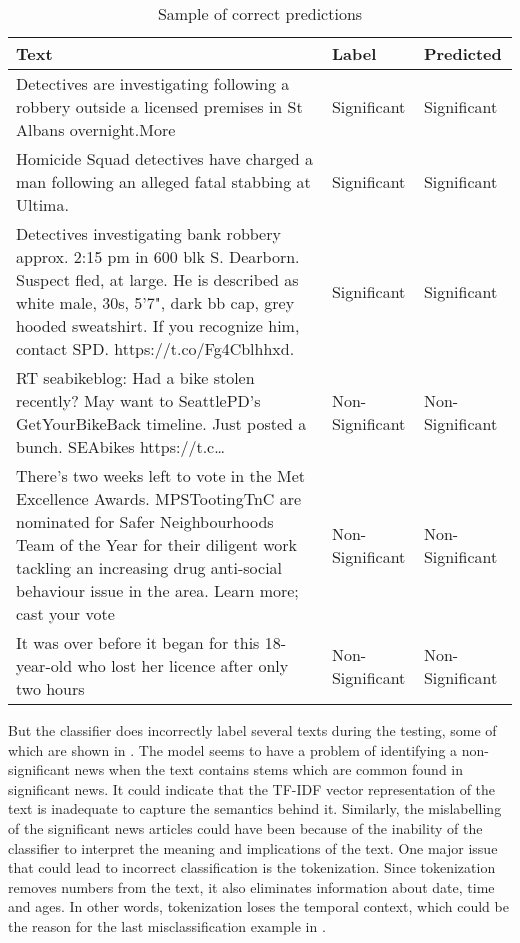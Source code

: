 \begin{table}
\begin{center}
\caption{Sample of correct predictions}
\label{tbl:correct_predictions}
\begin{tabular}{p{9cm}p{2.5cm}p{2.5cm}}
\toprule 
Text&Label&Predicted\\
\midrule 
Detectives are investigating following a robbery outside a licensed premises in St Albans overnight.More &Significant&Significant\\
\hline
Homicide Squad detectives have charged a man following an alleged fatal stabbing at Ultima.&Significant&Significant\\
\hline
Detectives investigating bank robbery approx. 2:15 pm in 600 blk S. Dearborn.  Suspect fled, at large. He is described as white male, 30s, 5'7", dark bb cap, grey hooded sweatshirt. If you recognize him, contact SPD. https://t.co/Fg4Cblhhxd.&Significant&Significant\\
\hline
RT seabikeblog: Had a bike stolen recently? May want to SeattlePD’s GetYourBikeBack timeline. Just posted a bunch. SEAbikes https://t.c…
&Non-Significant&Non-Significant\\
\hline
There's two weeks left to vote in the Met Excellence Awards. MPSTootingTnC are nominated for Safer Neighbourhoods Team of the Year for their diligent work tackling an increasing drug anti-social behaviour issue in the area. Learn more; cast your vote&Non-Significant&Non-Significant\\
\hline
It was over before it began for this 18-year-old who lost her licence after only two hours&Non-Significant&Non-Significant\\
\bottomrule
\end{tabular}
\end{center}
\end{table}

But the classifier does incorrectly label several texts during the testing, some of which are shown in . The model seems to have a problem of identifying a non-significant news when the text contains stems which are common found in significant news. It could indicate that the TF-IDF vector representation of the text is inadequate to capture the semantics behind it. Similarly, the mislabelling of the significant news articles could have been because of the inability of the classifier to interpret the meaning and implications of the text. One major issue that could lead to incorrect classification is the tokenization. Since tokenization removes numbers from the text, it also eliminates information about date, time and ages. In other words, tokenization loses the temporal context, which could be the reason for the last misclassification example in .

